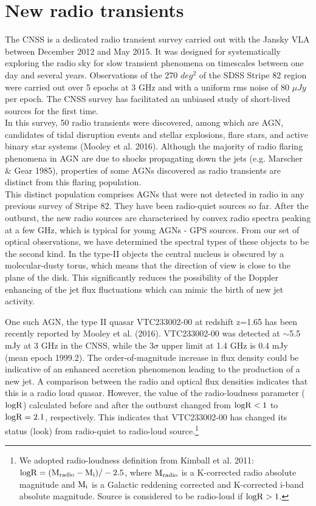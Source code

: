 \documentclass[utf8]{frontiersSCNS} %
\begin{document}
\section{New radio transients}
The CNSS is a dedicated radio transient survey carried out with the Jansky VLA between December 2012 and May 2015. It was designed for systematically exploring the radio sky for slow transient phenomena on timescales between one day and several years. Observations of the 270 $deg^2$ of the SDSS Stripe 82 region were carried out over 5 epochs at 3 GHz and with a uniform rms noise of 80 $\mu Jy$ per epoch.
The CNSS survey has facilitated an unbiased study of short-lived sources for the first time. \\
\indent In this survey, 50 radio transients were discovered, among which are AGN, candidates of tidal disruption events and stellar explosions, flare stars, and active binary star systems (Mooley et al. 2016).
Although the majority of radio flaring phenomena in AGN are due to shocks propagating down the jets (e.g. Marscher \& Gear 1985), properties of some AGNs discovered as radio transients are distinct from this flaring population.\\
\indent This distinct population comprises AGNs that were not detected in radio in any previous survey of Stripe 82. They have been radio-quiet sources so far. After the outburst, the new radio sources are characterised by convex radio spectra peaking at a few GHz, which is typical for young AGNs - GPS sources. From our set of optical observations, we have determined the spectral types of these objects to be the second kind. In the type-II objects the central nucleus is obscured by a molecular-dusty torus, which means that the direction of view is close to the plane of the disk. This significantly reduces the
possibility of the Doppler enhancing of the jet flux fluctuations which can mimic the birth of new jet activity.


One such AGN, the type II quasar VTC233002-00 at redshift z=1.65 has been recently reported by Mooley et al. (2016). VTC233002-00 was detected at $\sim$5.5 mJy at 3 GHz in the CNSS, while the 3$\sigma$ upper limit at 1.4 GHz is 0.4 mJy (mean epoch 1999.2). The order-of-magnitude increase in flux density could be indicative of an enhanced accretion phenomenon leading to the production of a new jet. A comparison between the radio and optical flux densities indicates that this is a radio loud quasar. However, the value of the radio-loudness  parameter ($\rm logR$) calculated before and after the outburst changed from $\rm logR <1$ to $\rm logR = 2.1$, respectively. This indicates that VTC233002-00 has changed its status (look) from radio-quiet to radio-loud source.\footnote{We adopted radio-loudness definition from Kimball et al. 2011: $\rm logR = (M_{radio}-M_{i})/-2.5$,
where $\rm M_{radio}$ is a K-corrected radio absolute magnitude and $\rm M_{i}$ is a Galactic reddening corrected and K-corrected i-band absolute magnitude. Source is considered to be radio-loud if $\rm logR>1$.}
\end{document}
